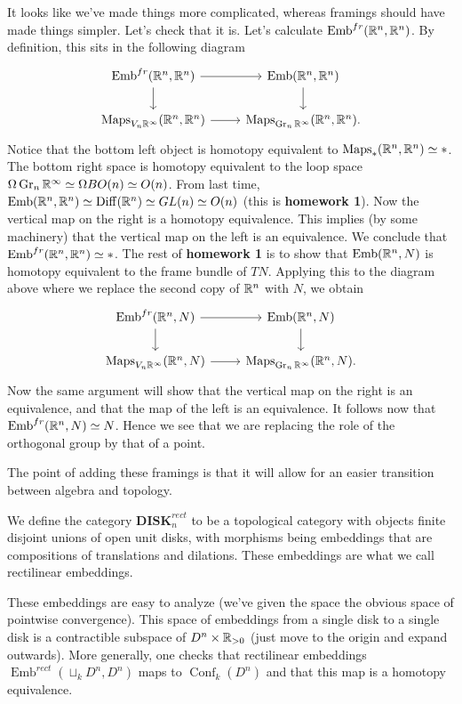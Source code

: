 \documentclass{amsart}
\DeclareMathOperator{\Emb}{Emb}
\DeclareMathOperator{\Conf}{Conf}
\begin{document}
It looks like we've made things more complicated, whereas framings should have made
things simpler. Let's check that it is. Let's calculate $\Emb^{fr}(\R^n, \R^n)$.
By definition, this sits in the following diagram
\begin{equation*}
    \begin{tikzcd}
        \Emb^{fr}(\R^n, \R^n) \rar\dar & \Emb(\R^n, \R^n)\dar \\
        \Maps_{V_n\R^\infty}(\R^n, \R^n) \rar & \Maps_{\Gr_n\R^\infty}(\R^n,\R^n).
    \end{tikzcd}
\end{equation*}
Notice that the bottom left object is homotopy equivalent to $\operatorname{Maps}_*(\mathbb{R}^n,\mathbb{R}^n)\simeq *$.
The bottom right space is homotopy equivalent to the loop space $\Omega\operatorname{Gr}_n\mathbb{R}^\infty\simeq \Omega BO(n)\simeq O(n)$.
From last time, $\Emb(\R^n,\R^n)\simeq \Diff(\R^n)\simeq GL(n)\simeq O(n)$ (this is
\textbf{homework 1}). Now the vertical map on the right is a homotopy equivalence.
This implies (by some machinery) that the vertical map on the left is an equivalence.
We conclude that $\Emb^{fr}(\R^n,\R^n)\simeq *$. The rest of \textbf{homework 1} is to
show that $\Emb(\R^n, N)$ is homotopy equivalent to the frame bundle of $TN$. Applying this
to the diagram above where we replace the second copy of $\mathbb{R}^n$ with $N$, we obtain
\begin{equation*}
    \begin{tikzcd}
        \Emb^{fr}(\R^n, N) \rar\dar & \Emb(\R^n, N)\dar \\
        \Maps_{V_n\R^\infty}(\R^n, N) \rar & \Maps_{\Gr_n\R^\infty}(\R^n,N).
    \end{tikzcd}
\end{equation*}
Now the same argument will show that the vertical map on the right is an equivalence,
and that the map of the left is an equivalence. It follows now that $\Emb^{fr}(\R^n,N)\simeq N$.
Hence we see that we are replacing the role of the orthogonal group by that of a point.

The point of adding these framings is that it will allow for an easier transition between
algebra and topology.
\begin{definition}
    We define the category $\mathbf{DISK}_n^{rect}$ to be a topological category with objects
    finite disjoint unions of open unit disks, with morphisms being embeddings that are compositions
    of translations and dilations. These embeddings are what we call rectilinear embeddings.
\end{definition}
These embeddings are easy to analyze (we've given the space the obvious space of pointwise
convergence). This space of embeddings from a single disk to a single disk is a contractible
subspace of $D^n\times\mathbb{R}_{>0}$ (just move to the origin and expand outwards). More generally,
one checks that rectilinear embeddings $\Emb^{rect}(\sqcup_k D^n, D^n)$ maps to
$\Conf_k(D^n)$ and that this map is a homotopy equivalence.
\end{document}
